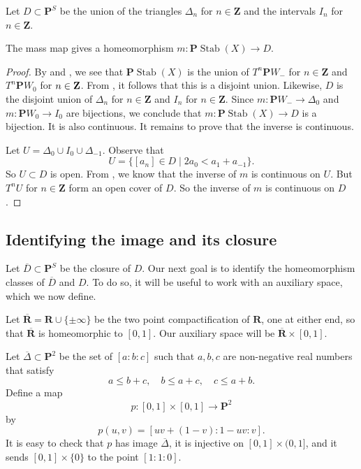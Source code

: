 \documentclass{amsart}
\begin{document}
Let \(D \subset \mathbf{P}^S\) be the union of the triangles \(\Delta_n\) for \(n \in \mathbf{Z}\) and the intervals \(I_n\) for \(n \in \mathbf{Z}\).
\begin{theorem}\label{thm:homeo}
  The mass map gives a homeomorphism \(m \colon \mathbf{P} \operatorname{Stab}(X) \to D\).
\end{theorem}
\begin{proof}
  By  and , we see that \(\mathbf{P}\operatorname{Stab}(X)\) is the union of \(T^n \mathbf{P}W_-\) for \(n \in \mathbf{Z}\) and \(T^n \mathbf{P} W_0\) for \(n \in {\bf Z}\).
  From , it follows that this is a disjoint union.
  Likewise, \(D\) is the disjoint union of \(\Delta_n\) for \(n \in \mathbf{Z}\) and \(I_n\) for \(n \in \mathbf{Z}\).
  Since \(m \colon \mathbf{P}W_- \to \Delta_0\) and \(m \colon \mathbf{P}W_0 \to I_0\) are bijections, we conclude that \(m \colon \mathbf{P} \operatorname{Stab}(X) \to D\) is a bijection.
  It is also continuous.
  It remains to prove that the inverse is continuous.

  Let \(U = \Delta_0 \cup I_0 \cup \Delta_{-1}\).
  Observe that
  \[ U = \{[a_n] \in D \mid 2a_0 < a_1 + a_{-1}\}.\]
  So \(U \subset D\) is open.
  From , we know that the inverse of \(m\) is continuous on \(U\).
  But \(T^n U\) for \(n \in \mathbf{Z}\) form an open cover of \(D\).
  So the inverse of \(m\) is continuous on \(D\).
\end{proof}

\subsection{Identifying the image and its closure}
Let \(\overline D \subset \mathbf{P}^S\) be the closure of \(D\).
Our next goal is to identify the homeomorphism classes of \(\overline D\) and \(D\).
To do so, it will be useful to work with an auxiliary space, which we now define.

Let \(\overline{\mathbf{R}} = \mathbf{R} \cup \{\pm \infty\}\) be the two point compactification of \(\mathbf{R}\), one at either end, so that \(\overline{\mathbf{R}}\) is homeomorphic to \([0,1]\).
Our auxiliary space will be \(\overline{\mathbf{R}} \times [0,1]\).

Let \(\overline \Delta \subset \mathbf{P}^2\) be the set of \([a:b:c]\) such that \(a,b,c\) are non-negative real numbers that satisfy
\[ a  \leq b+c, \quad b \leq a+c, \quad c \leq a+b.\]
Define a map
\[ p \colon [0,1] \times [0,1] \to \mathbf{P}^2\]
by
\[ p(u,v) = [uv+(1-v) : 1-uv :v].\]
It is easy to check that \(p\) has image \(\overline \Delta\), it is injective on \([0,1] \times (0,1]\), and it sends \([0,1] \times \{0\}\) to the point \([1:1:0]\).
\end{document}
